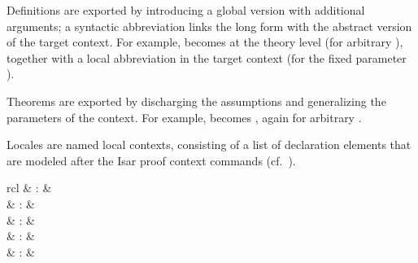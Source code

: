 \begin{isabellebody}
\begin{isamarkuptext}
  Definitions are exported by introducing a global version with
  additional arguments; a syntactic abbreviation links the long form
  with the abstract version of the target context.  For example,
   becomes  at the theory
  level (for arbitrary ), together with a local
  abbreviation  in the target context (for the
  fixed parameter ).

  Theorems are exported by discharging the assumptions and
  generalizing the parameters of the context.  For example,  becomes , again for arbitrary
  .%
\end{isamarkuptext}%
\isamarkuptrue%
%
\isamarkuptrue%
%
\begin{isamarkuptext}%
Locales are named local contexts, consisting of a list of
  declaration elements that are modeled after the Isar proof context
  commands (cf.\ ).%
\end{isamarkuptext}%
\isamarkuptrue%
%
\isamarkuptrue%
%
\begin{isamarkuptext}%
\begin{matharray}{rcl}
    \mbox{} & : &  \\
    \mbox{}\isa{{\isachardoublequote}\isactrlsup {\isacharasterisk}{\isachardoublequote}} & : &  \\
    \mbox{}\isa{{\isachardoublequote}\isactrlsup {\isacharasterisk}{\isachardoublequote}} & : &  \\
    \mbox{} & : & \isarmeth \\
    \mbox{} & : & \isarmeth \\
  \end{matharray}


\end{isamarkuptext}
\end{isabellebody}
